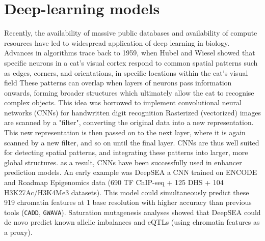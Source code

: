 

\section{Deep-learning models}
Recently, the availability of massive public databases and availability of compute resources have led to widespread application of deep learning in biology. Advances in algorithms trace back to 1959, when Hubel and Wiesel showed that specific neurons in a cat's visual cortex respond to common spatial patterns such as edges, corners, and orientations, in specific locations within the cat's visual field These patterns can overlap when layers of neurons pass information onwards, forming broader structures which ultimately allow the cat to recognise complex objects. This idea was borrowed to implement convolutional neural networks (CNNs) for handwritten digit recognition Rasterized (vectorized) images are scanned by a "filter", converting the original data into a new representation. This new representation is then passed on to the next layer, where it is again scanned by a new filter, and so on until the final layer. CNNs are thus well suited for detecting spatial patterns, and integrating these patterns into larger, more global structures. as a result, CNNs have been successfully used in enhancer prediction models. An early example was DeepSEA a CNN trained on ENCODE and Roadmap Epigenomics data (690 TF ChIP-seq + 125 DHS + 104 H3K27Ac/H3K4Me3 datasets). This model could simultaneously predict these 919 chromatin features at 1 base resolution with higher accuracy than previous tools (\verb|CADD|, \verb|GWAVA|). Saturation mutagenesis analyses showed that DeepSEA could de novo predict known allelic imbalances and eQTLs (using chromatin features as a proxy).


